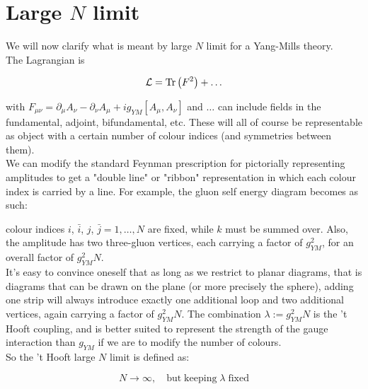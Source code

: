 \section{Large $N$ limit}

We will now clarify what is meant by large $N$ limit for a Yang-Mills theory.\\

The Lagrangian is

\[\mathcal{L} = \operatorname{Tr} \left(F^2\right) + \ldots \]

with $F_{\mu\nu} = \partial_\mu A_\nu - \partial_\nu A_\mu + i g_{YM} [A_\mu,A_\nu]$ and $\ldots$ can include fields in the fundamental, adjoint, bifundamental, etc. These will all of course be representable as object with a certain number of colour indices (and symmetries between them).\\

We can modify the standard Feynman prescription for pictorially representing amplitudes to get a "double line" or "ribbon" representation in which each colour index is carried by a line. For example, the gluon self energy diagram becomes as such:\\


\begin{center}
\def\svgwidth{200pt}

\end{center}

colour indices $i$, $\bar i$, $j$, $\bar j = 1 , \ldots , N$ are fixed, while $k$ must be summed over. Also, the amplitude has two three-gluon vertices, each carrying a factor of $g_{YM}^2$, for an overall factor of $g_{YM}^2 N$.\\

It's easy to convince oneself that as long as we restrict to planar diagrams, that is diagrams that can be drawn on the plane (or more precisely the sphere), adding one strip will always introduce exactly one additional loop and two additional vertices, again carrying a factor of $g_{YM}^2 N$. The combination $\lambda := g_{YM}^2 N$ is the 't Hooft coupling, and is better suited to represent the strength of the gauge interaction than $g_{YM}$ if we are to modify the number of colours.\\

So the 't Hooft large $N$ limit is defined as:

\begin{equation}
N \rightarrow \infty, \quad \mathrm{but \; keeping } \; \lambda \; \mathrm{fixed}
\end{equation}


